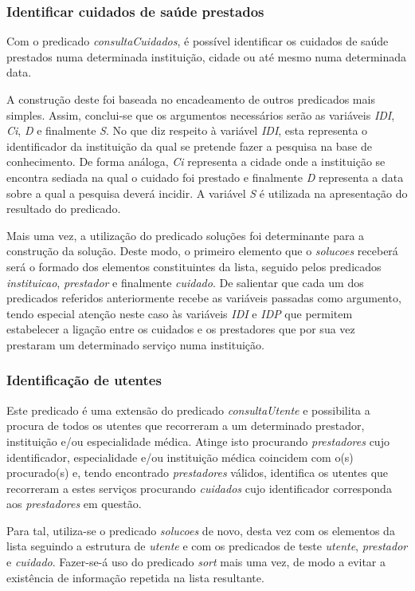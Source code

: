 \documentclass[a4paper]{article}
\begin{document}
\subsubsection{Identificar cuidados de saúde prestados}

\hspace{3mm} 
Com o predicado \textit{consultaCuidados}, é possível identificar os cuidados de saúde prestados numa determinada instituição, cidade ou até mesmo numa determinada data.
\par A construção deste foi baseada no encadeamento de outros predicados mais simples. Assim, conclui-se que os argumentos necessários serão as variáveis \emph{IDI}, \emph{Ci}, \emph{D} e finalmente \emph{S}. No que diz respeito à variável \emph{IDI}, esta representa o identificador da instituição da qual se pretende fazer a pesquisa na base de conhecimento. De forma análoga, \emph{Ci} representa a cidade onde a instituição se encontra sediada na qual o cuidado foi prestado e finalmente \emph{D} representa a data sobre a qual a pesquisa deverá incidir. A variável \emph{S} é utilizada na apresentação do resultado do predicado.
\par Mais uma vez, a utilização do predicado soluções foi determinante para a construção da solução. Deste modo, o primeiro elemento que o \emph{solucoes} receberá será o formado dos elementos constituintes da lista, seguido pelos predicados \textit{instituicao}, \textit{prestador} e finalmente \textit{cuidado}. De salientar que cada um dos predicados referidos anteriormente recebe as variáveis passadas como argumento, tendo especial atenção neste caso às variáveis \emph{IDI} e \emph{IDP} que permitem estabelecer a ligação entre os cuidados e os prestadores que por sua vez prestaram um determinado serviço numa instituição.

\subsubsection{Identificação de utentes}

\hspace{3mm} Este predicado é uma extensão do predicado \textit{consultaUtente} e possibilita a procura de todos os utentes que recorreram a um determinado prestador, instituição e/ou especialidade médica. Atinge isto procurando \textit{prestadores} cujo identificador, especialidade e/ou instituição médica coincidem com o(s) procurado(s) e, tendo encontrado \textit{prestadores} válidos, identifica os utentes que recorreram a estes serviços procurando \textit{cuidados} cujo identificador corresponda aos \textit{prestadores} em questão.
\par Para tal, utiliza-se o predicado \textit{solucoes} de novo, desta vez com os elementos da lista seguindo a estrutura de \textit{utente} e com os predicados de teste \textit{utente}, \textit{prestador} e \textit{cuidado}. Fazer-se-á uso do predicado \textit{sort} mais uma vez, de modo a evitar a existência de informação repetida na lista resultante.
\end{document}
